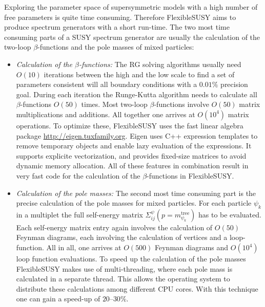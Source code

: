 \documentclass[final,3p,11pt,pdflatex]{elsarticle}
\newcommand{\fs}{FlexibleSUSY\xspace}
\begin{document}
Exploring the parameter space of supersymmetric models with a high
number of free parameters is quite time consuming.  Therefore \fs aims
to produce spectrum generators with a short run-time.  The two most
time consuming parts of a SUSY spectrum generator are usually the
calculation of the two-loop $\beta$-functions and the pole masses of
mixed particles:
%
\begin{itemize}
\item \emph{Calculation of the $\beta$-functions:} The RG solving
  algorithms usually need $O(10)$ iterations between the high and the
  low scale to find a set of parameters consistent will all boundary
  conditions with a $0.01\%$ precision goal.  During each iteration
  the Runge-Kutta algorithm needs to calculate all $\beta$-functions
  $O(50)$ times.  Most two-loop $\beta$-functions involve $O(50)$
  matrix multiplications and additions.  All together one arrives at
  $O(10^4)$ matrix operations.  To optimize these, \fs uses the fast
  linear algebra package \href{Eigen}{http://eigen.tuxfamily.org}.
  Eigen uses C++ expression templates to remove temporary objects and
  enable lazy evaluation of the expressions.  It supports explicite
  vectorization, and provides fixed-size matrices to avoid dynamic
  memory allocation.  All of these features in combination result in
  very fast code for the calculation of the $\beta$-functions in \fs.
%
\item \emph{Calculation of the pole masses:} The second most time
  consuming part is the precise calculation of the pole masses for
  mixed particles.  For each particle $\psi_k$ in a multiplet the full
  self-energy matrix $\Sigma^\psi_{ij}(p=m^\text{tree}_{\psi_k})$ has
  to be evaluated.  Each self-energy matrix entry again involves the
  calculation of $O(50)$ Feynman diagrams, each involving the
  calculation of vertices and a loop-function.  All in all, one
  arrives at $O(500)$ Feynman diagrams and $O(10^4)$ loop function
  evaluations.  To speed up the calculation of the pole masses \fs
  makes use of multi-threading, where each pole mass is calculated in
  a separate thread.  This allows the operating system to distribute
  these calculations among different CPU cores.  With this technique
  one can gain a speed-up of $20$--$30\%$.
\end{itemize}
\end{document}
